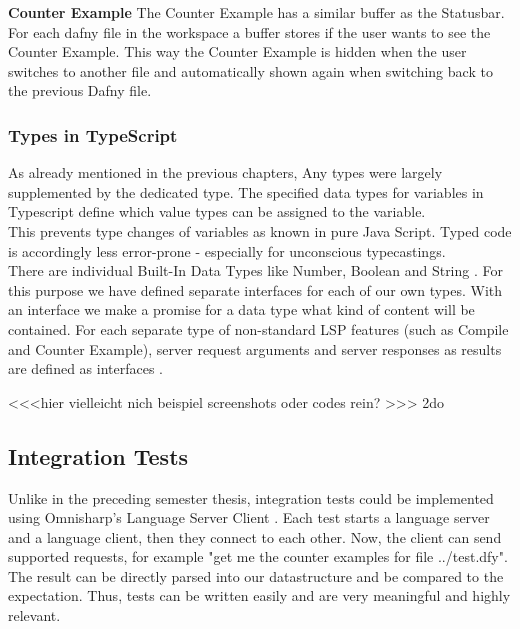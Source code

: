 {\bf Counter Example} \textendash{}
The Counter Example has a similar buffer as the Statusbar.
For each dafny file in the workspace a buffer stores if the user wants to see the Counter Example.
This way the Counter Example is hidden when the user switches to another file
and automatically shown again when switching back to the previous Dafny file.

\subsubsection{Types in TypeScript}
As already mentioned in the previous chapters, Any types were largely supplemented by the dedicated type.
The specified data types for variables in Typescript define which value types can be assigned to the variable. \\

This prevents type changes of variables as known in pure Java Script.
Typed code is accordingly less error-prone - especially for unconscious typecastings. \\

There are individual Built-In Data Types like Number, Boolean and String \cite{ts-types}.
For this purpose we have defined separate interfaces for each of our own types.
With an interface we make a promise for a data type what kind of content will be contained.
For each separate type of non-standard LSP features (such as Compile and Counter Example),
server request arguments and server responses as results are defined as interfaces \cite{ts-interface}.

<<<hier vielleicht nich beispiel screenshots oder codes rein? >>> 2do

\subsection{Integration Tests}
Unlike in the preceding semester thesis, integration tests could be implemented using Omnisharp's Language Server Client \cite{omnisharpClient}. Each test starts a language server and a language client, then they connect to each other. Now, the client can send supported requests, for example "get me the counter examples for file ../test.dfy". The result can be directly parsed into our  datastructure and be compared to the expectation. Thus, tests can be written easily and are very meaningful and highly relevant.

